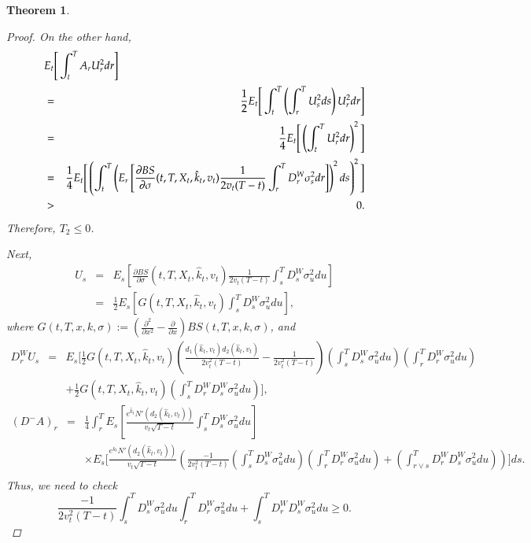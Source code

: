 \documentclass[11pt]{article}
\newtheorem{theorem}{Theorem}
\begin{document}
\begin{theorem}
\begin{proof}
On the other hand, 
\begin{eqnarray}
\lefteqn{E_t\Bigg[\int_{t}^{T} A_r U_r^2 dr \Bigg]}\nonumber\\
&=&\frac{1}{2}E_t\Bigg[\int_{t}^{T} \left(\int_r^TU_s^2ds\right) U_r^2 dr \Bigg]\nonumber\\
&=&\frac{1}{4}E_t\Bigg[ \left(\int_t^TU_r^2dr\right)^2  \Bigg]\nonumber\\
&=&\frac{1}{4}E_t\Bigg[ \left(\int_t^T\left(    E_r\left[\frac{\partial BS}{\partial \sigma}(t,T,X_t,\hat{k}_t,v_t)\frac{1}{2v_t(T-t)}\int_r^TD_r^W\sigma_s^2 dr\right]
    \right)^2ds\right)^2  \Bigg]\nonumber\\
&>& 0.
\end{eqnarray}
Therefore, $T_2\le 0$.

Next,
\begin{eqnarray}
\label{U}
U_s&=&E_s\left[\frac{\partial BS}{\partial \sigma}(t,T,X_t,\hat{k}_t,v_t)\frac{1}{2v_t(T-t)}\int_s^T D_s^W \sigma_u^2 du\right]  \nonumber\\
&=&\frac12    E_s\left[G(t,T,X_t,\hat{k}_t,v_t)\int_s^T D_s^W \sigma_u^2 du\right],
\end{eqnarray}
where $G(t,T,x,k,\sigma ):=( \frac{\partial ^{2}}{\partial x^{2}}-\frac{\partial}{\partial x}) BS(t,T,x,k,\sigma )$,
and
\begin{eqnarray}
\label{DU}
D_r^WU_s&=& E_s\Bigg[ \frac12 
G(t,T,X_t,\hat{k}_t,v_t)\left(\frac{d_1(\hat{k}_t,v_t)d_2(\hat{k}_t,v_t)}{2v_t^2(T-t)} - \frac{1}{2v_t^2(T-t)}\right)
\left(\int_s^T D_s^W\sigma_u^2 du\right)\left(\int_r^TD_r^W\sigma_u^2 du\right)
\nonumber\\
&&+\frac12G(t,T,X_t,\hat{k}_t,v_t)\left(\int_s^TD_r^WD_s^W\sigma_u^2 du\right)\Bigg],
\end{eqnarray}
\begin{eqnarray}
\label{DA2}
(D^-A)_r
&=&
\frac{1}{4}
\int_r^T E_s\left[\frac{e^{\hat{k}_t}N'(d_2(\hat{k}_t,v_t))}{v_t\sqrt{T-t}}\int_s^TD_s^W\sigma_u^2 du    \right] \nonumber\\
&&\times E_s \Bigg[
\frac{e^{\hat{k}_t}N'(d_2(\hat{k}_t,v_t))}{v_t\sqrt{T-t}}
\left(
\frac{-1}{2 v_t^2(T-t)}
\left(\int_s^TD_s^W\sigma_u^2 du\right)\left(\int_r^TD_r^W\sigma_u^2 du\right)+\left(\int_{r\vee s}^TD_r^WD_s^W\sigma_u^2 du\right)\right)
\Bigg] ds.\nonumber\\
&&
\end{eqnarray}
Thus, we need to check
\begin{equation}
\frac{-1}{2 v_t^2(T-t)}\int_s^TD_s^W\sigma_u^2 du\int_r^TD_r^W\sigma_u^2 du+\int_s^TD_r^WD_s^W\sigma_u^2 du \ge 0.

\end{equation}
\end{proof}
\end{theorem}
\end{document}

